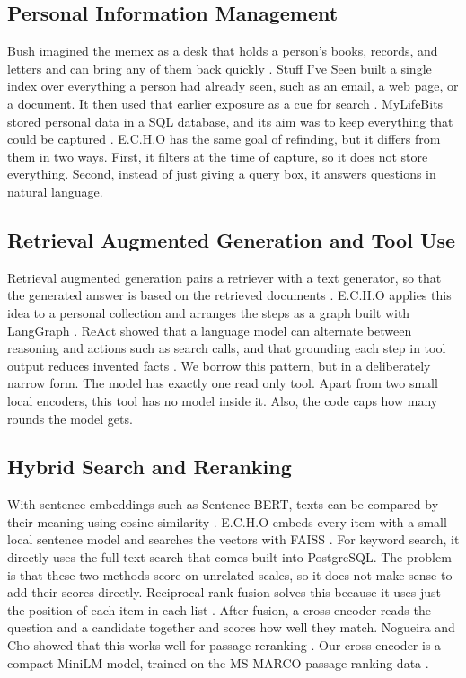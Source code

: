 \documentclass[conference]{IEEEtran}
\begin{document}
\subsection{Personal Information Management}
Bush imagined the memex as a desk that holds a person's books, records, and letters and can bring any of them back quickly \cite{b1}. Stuff I've Seen built a single index over everything a person had already seen, such as an email, a web page, or a document. It then used that earlier exposure as a cue for search \cite{b2}. MyLifeBits stored personal data in a SQL database, and its aim was to keep everything that could be captured \cite{b3}. E.C.H.O has the same goal of refinding, but it differs from them in two ways. First, it filters at the time of capture, so it does not store everything. Second, instead of just giving a query box, it answers questions in natural language.

\subsection{Retrieval Augmented Generation and Tool Use}
Retrieval augmented generation pairs a retriever with a text generator, so that the generated answer is based on the retrieved documents \cite{b4}. E.C.H.O applies this idea to a personal collection and arranges the steps as a graph built with LangGraph \cite{b5}. ReAct showed that a language model can alternate between reasoning and actions such as search calls, and that grounding each step in tool output reduces invented facts \cite{b13}. We borrow this pattern, but in a deliberately narrow form. The model has exactly one read only tool. Apart from two small local encoders, this tool has no model inside it. Also, the code caps how many rounds the model gets.

\subsection{Hybrid Search and Reranking}
With sentence embeddings such as Sentence BERT, texts can be compared by their meaning using cosine similarity \cite{b6}. E.C.H.O embeds every item with a small local sentence model \cite{b16} and searches the vectors with FAISS \cite{b8}. For keyword search, it directly uses the full text search that comes built into PostgreSQL. The problem is that these two methods score on unrelated scales, so it does not make sense to add their scores directly. Reciprocal rank fusion solves this because it uses just the position of each item in each list \cite{b9}. After fusion, a cross encoder reads the question and a candidate together and scores how well they match. Nogueira and Cho showed that this works well for passage reranking \cite{b10}. Our cross encoder is a compact MiniLM \cite{b7} model, trained on the MS MARCO passage ranking data \cite{b11}.
\end{document}
